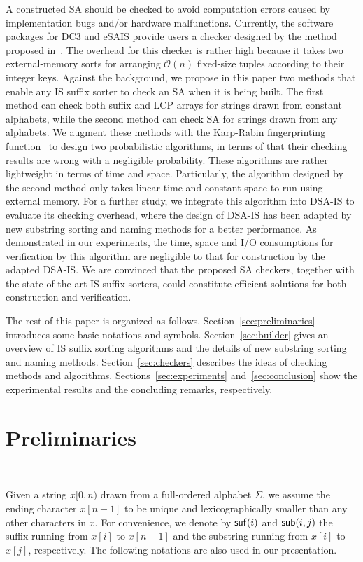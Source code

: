 \documentclass[10pt,journal,compsoc]{IEEEtran}
\begin{document}
A constructed SA should be checked to avoid computation errors caused by implementation bugs and/or hardware malfunctions. Currently, the software packages for DC3 and eSAIS provide users a checker designed by the method proposed in~\cite{Dementiev2008a}. The overhead for this checker is rather high because it takes two external-memory sorts for arranging $\mathcal{O}(n)$ fixed-size tuples according to their integer keys. Against the background, we propose in this paper two methods that enable any IS suffix sorter to check an SA when it is being built. The first method can check both suffix and LCP arrays for strings drawn from constant alphabets, while the second method can check SA for strings drawn from any alphabets. We augment these methods with the Karp-Rabin fingerprinting function~\cite{Karp1987} to design two probabilistic algorithms, in terms of that their checking results are wrong with a negligible probability. These algorithms are rather lightweight in terms of time and space. Particularly, the algorithm designed by the second method only takes linear time and constant space to run using external memory. For a further study, we integrate this algorithm into DSA-IS to evaluate its checking overhead, where the design of DSA-IS has been adapted by new substring sorting and naming methods for a better performance. As demonstrated in our experiments, the time, space and I/O consumptions for verification by this algorithm are negligible to that for construction by the adapted DSA-IS. We are convinced that the proposed SA checkers, together with the state-of-the-art IS suffix sorters, could constitute efficient solutions for both construction and verification.

The rest of this paper is organized as follows. Section~\ref{sec:preliminaries} introduces some basic notations and symbols. Section~\ref{sec:builder} gives an overview of IS suffix sorting algorithms and the details of new substring sorting and naming methods. Section~\ref{sec:checkers} describes the ideas of checking methods and algorithms. Sections~\ref{sec:experiments} and~\ref{sec:conclusion} show the experimental results and the concluding remarks, respectively.

\section{Preliminaries}~\label{sec:preliminaries}

Given a string $x[0,n)$ drawn from a full-ordered alphabet $\Sigma$, we assume the ending character $x[n - 1]$ to be unique and lexicographically smaller than any other characters in $x$. For convenience, we denote by ${\sf suf}(i)$ and ${\sf sub}(i, j)$ the suffix running from $x[i]$ to $x[n-  1]$ and the substring running from $x[i]$ to $x[j]$, respectively. The following notations are also used in our presentation.
\end{document}
